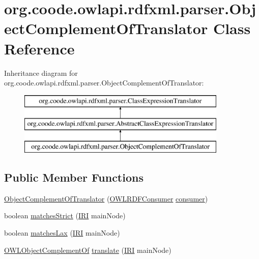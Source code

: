\hypertarget{classorg_1_1coode_1_1owlapi_1_1rdfxml_1_1parser_1_1_object_complement_of_translator}{\section{org.\-coode.\-owlapi.\-rdfxml.\-parser.\-Object\-Complement\-Of\-Translator Class Reference}
\label{classorg_1_1coode_1_1owlapi_1_1rdfxml_1_1parser_1_1_object_complement_of_translator}
}
Inheritance diagram for org.\-coode.\-owlapi.\-rdfxml.\-parser.\-Object\-Complement\-Of\-Translator\-:\begin{figure}[H]
\begin{center}
\leavevmode
\includegraphics[height=3.000000cm]{classorg_1_1coode_1_1owlapi_1_1rdfxml_1_1parser_1_1_object_complement_of_translator}
\end{center}
\end{figure}
\subsection*{Public Member Functions}
\begin{DoxyCompactItemize}
\item 
\hyperlink{classorg_1_1coode_1_1owlapi_1_1rdfxml_1_1parser_1_1_object_complement_of_translator_a34aaf126c146832df9ea97b8da120190}{Object\-Complement\-Of\-Translator} (\hyperlink{classorg_1_1coode_1_1owlapi_1_1rdfxml_1_1parser_1_1_o_w_l_r_d_f_consumer}{O\-W\-L\-R\-D\-F\-Consumer} \hyperlink{classorg_1_1coode_1_1owlapi_1_1rdfxml_1_1parser_1_1_abstract_class_expression_translator_ae547084cdd5b92c03835b5aa404f823b}{consumer})
\item 
boolean \hyperlink{classorg_1_1coode_1_1owlapi_1_1rdfxml_1_1parser_1_1_object_complement_of_translator_a42cbcc3387fa0aa8c46b614bafe29257}{matches\-Strict} (\hyperlink{classorg_1_1semanticweb_1_1owlapi_1_1model_1_1_i_r_i}{I\-R\-I} main\-Node)
\item 
boolean \hyperlink{classorg_1_1coode_1_1owlapi_1_1rdfxml_1_1parser_1_1_object_complement_of_translator_aca5649838d48fc6833078c24714a4974}{matches\-Lax} (\hyperlink{classorg_1_1semanticweb_1_1owlapi_1_1model_1_1_i_r_i}{I\-R\-I} main\-Node)
\item 
\hyperlink{interfaceorg_1_1semanticweb_1_1owlapi_1_1model_1_1_o_w_l_object_complement_of}{O\-W\-L\-Object\-Complement\-Of} \hyperlink{classorg_1_1coode_1_1owlapi_1_1rdfxml_1_1parser_1_1_object_complement_of_translator_ac9daa439eeb9788fd36b5a297582d0e9}{translate} (\hyperlink{classorg_1_1semanticweb_1_1owlapi_1_1model_1_1_i_r_i}{I\-R\-I} main\-Node)
\end{DoxyCompactItemize}
